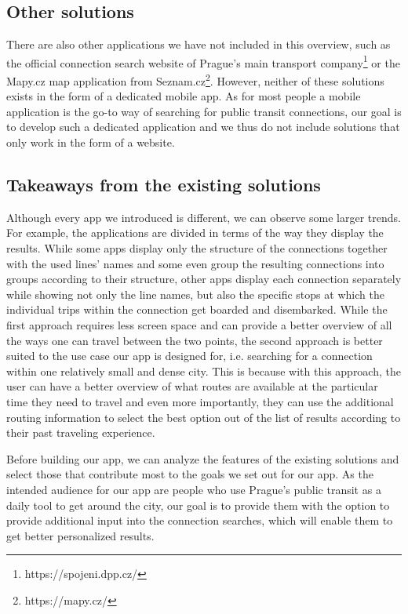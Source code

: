 \subsection{Other solutions}

There are also other applications we have not included in this overview, such as the official connection search website of Prague's main transport company\footnote{https://spojeni.dpp.cz/} or the Mapy.cz map application from Seznam.cz\footnote{https://mapy.cz/}. However, neither of these solutions exists in the form of a dedicated mobile app. As for most people a mobile application is the go-to way of searching for public transit connections, our goal is to develop such a dedicated application and we thus do not include solutions that only work in the form of a website.

\subsection{Takeaways from the existing solutions}

Although every app we introduced is different, we can observe some larger trends. For example, the applications are divided in terms of the way they display the results. While some apps display only the structure of the connections together with the used lines' names and some even group the resulting connections into groups according to their structure, other apps display each connection separately while showing not only the line names, but also the specific stops at which the individual trips within the connection get boarded and disembarked. While the first approach requires less screen space and can provide a better overview of all the ways one can travel between the two points, the second approach is better suited to the use case our app is designed for, i.e. searching for a connection within one relatively small and dense city. This is because with this approach, the user can have a better overview of what routes are available at the particular time they need to travel and even more importantly, they can use the additional routing information to select the best option out of the list of results according to their past traveling experience.



Before building our app, we can analyze the features of the existing solutions and select those that contribute most to the goals we set out for our app. As the intended audience for our app are people who use Prague's public transit as a daily tool to get around the city, our goal is to provide them with the option to provide additional input into the connection searches, which will enable them to get better personalized results.

